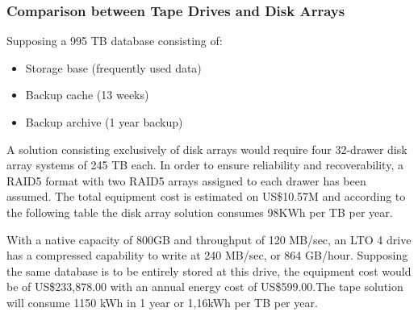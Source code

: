             \subsubsection*{Comparison between Tape Drives and Disk Arrays}
                Supposing a 995 TB database consisting of:
                \begin{itemize}
                	\item Storage base (frequently used data)
                	\item Backup cache (13 weeks)
                	\item Backup archive (1 year backup)
                \end{itemize}
                A solution consisting exclusively of disk arrays would require four 32-drawer disk array systems of 245 TB each. In order to ensure reliability and recoverability, a RAID5 format with two RAID5 arrays assigned to each drawer has been assumed. The total equipment cost is estimated on US\$10.57M \cite{Reine08} and according to the following table the disk array solution consumes 98KWh per TB per year.
                \begin{table}[h!tb]
                \centering 
                \label{tab:tape_drive_power_costs} %
                \end{table}
                With a native capacity of 800GB and throughput of 120 MB/sec, an LTO 4 drive has a compressed capability to write at 240 MB/sec, or 864 GB/hour. Supposing the same database is to be entirely stored at this drive, the equipment cost would be of US\$233,878.00 with an annual energy cost of US\$599.00.The tape solution will consume 1150 kWh in 1 year or 1,16kWh per TB per year.
